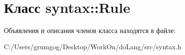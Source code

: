 \hypertarget{classsyntax_1_1_rule}{}\section{Класс syntax\+:\+:Rule}
\label{classsyntax_1_1_rule}


Объявления и описания членов класса находятся в файле\+:\begin{DoxyCompactItemize}
\item 
C\+:/\+Users/grumgog/\+Desktop/\+Work\+On/do\+Lang/src/syntax.\+h\end{DoxyCompactItemize}
